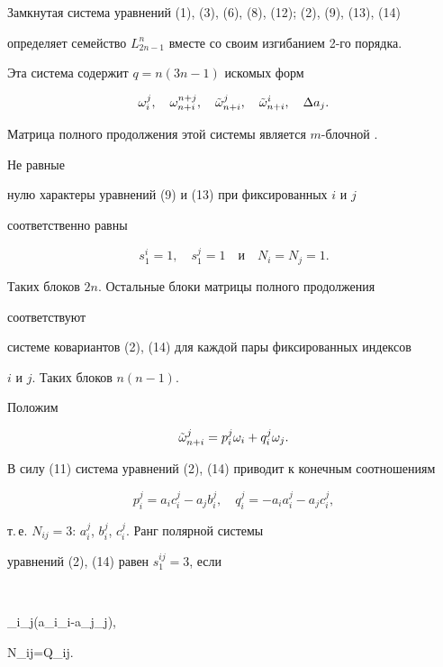  


Замкнутая система уравнений (1), (3), (6), (8), (12); (2), (9), (13), (14) 


определяет семейство $L^n_{2n-1}$ вместе со своим изгибанием 2-го порядка. 


Эта система содержит $q=n(3n-1)$ искомых форм


$$ 


\omega^j_i,\quad \omega^{n+j}_{n+i},\quad 


\Tilde\omega^j_{n+i},\quad \Tilde \omega^i_{n+i}, 


\quad\Delta a_j. 


$$ 


Матрица полного продолжения этой системы является $m$-блочной \cite{Mak2}. 


Не равные 


нулю характеры уравнений (9) и (13) при фиксированных $i$ и $j$ 


соответственно равны 


$$ 


s^i_1=1,\quad s^j_1=1\quad\text{и}\quad N_i=N_j=1. 


$$ 


Таких блоков $2n$. Остальные блоки матрицы полного продолжения 


соответствуют 


системе ковариантов (2), (14) для каждой пары фиксированных индексов 


$i$ и $j$. Таких блоков $n(n-1)$. 


 


Положим 


$$ 


\Tilde\omega^j_{n+i}=p^j_i\omega_i+q^j_i\omega_j. 


$$ 


В силу (11) система уравнений (2), (14) приводит к конечным соотношениям 


$$ 


p^j_i=a_ic^j_i-a_jb^j_i,\quad 


q^j_i=-a_ia^j_i-a_jc^j_i, 


$$ 


т.\,е. $N_{ij}=3$: $a^j_i$, $b^j_i$, $c^j_i$. Ранг полярной системы 


уравнений (2), (14) равен $s^{ij}_1=3$, если 


$$ 


\omega_i\omega_j(a_i\omega_i-a_j\omega_j),\quad 


\quad N_{ij}=Q_{ij}. 


